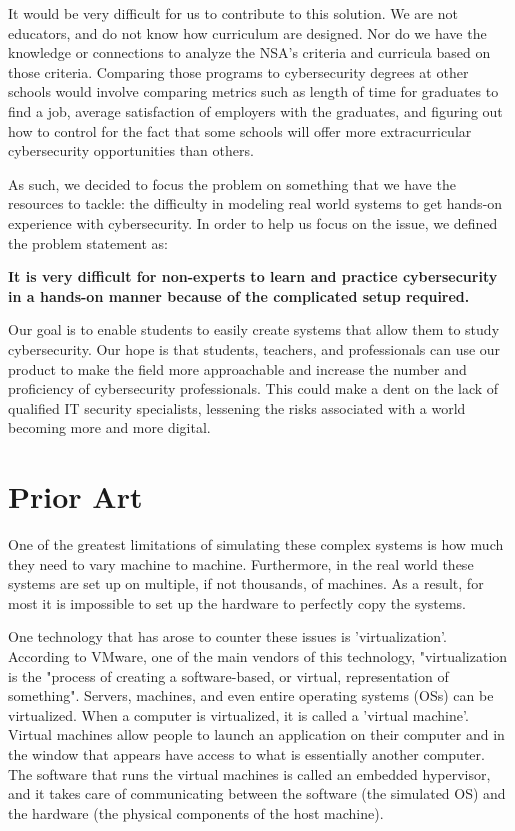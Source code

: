 \documentclass[openright]{report}
\begin{document}
\par It would be very difficult for us to contribute to this solution. We are not educators, and do not know how curriculum are designed. Nor do we have the knowledge or connections to analyze the NSA's criteria and curricula based on those criteria. Comparing those programs to cybersecurity degrees at other schools would involve comparing metrics such as length of time for graduates to find a job, average satisfaction of employers with the graduates, and figuring out how to control for the fact that some schools will offer more extracurricular cybersecurity opportunities than others. 

\par As such, we decided to focus the problem on something that we have the resources to tackle: the difficulty in modeling real world systems to get hands-on experience with cybersecurity. In order to help us focus on the issue, we defined the problem statement as:

\textbf{It is very difficult for non-experts to learn and practice cybersecurity in a hands-on manner because of the complicated setup required.}

\par Our goal is to enable students to easily create systems that allow them to study cybersecurity. Our hope is that students, teachers, and professionals can use our product to make the field more approachable and increase the number and proficiency of cybersecurity professionals. This could make a dent on the lack of qualified IT security specialists, lessening the risks associated with a world becoming more and more digital.

\section{Prior Art}

\par One of the greatest limitations of simulating these complex systems is how much they need to vary machine to machine. Furthermore, in the real world these systems are set up on multiple, if not thousands, of machines. As a result, for most it is impossible to set up the hardware to perfectly copy the systems.

\par One technology that has arose to counter these issues is 'virtualization'. According to VMware, one of the main vendors of this technology, "virtualization is the "process of creating a software-based, or virtual, representation of something"\cite{virtualization_def}. Servers, machines, and even entire operating systems (OSs) can be virtualized. When a computer is virtualized, it is called a 'virtual machine'. Virtual machines allow people to launch an application on their computer and in the window that appears have access to what is essentially another computer. The software that runs the virtual machines is called an embedded hypervisor, and it takes care of communicating between the software (the simulated OS) and the hardware (the physical components of the host machine)\cite{virtualization_comparison}.
\end{document}
